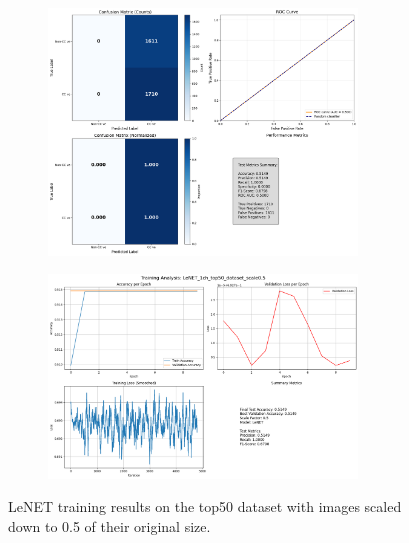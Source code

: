 \documentclass{pracalicmgr}
\begin{document}
\newpage

\begin{figure}[H]
    \centering
    \begin{subfigure}{\textwidth}
        \centering
        \includegraphics[width=0.9\textwidth]{src/LeNET_1ch_top50_dataset_scale05.png}
        \label{fig:Letop5005sub1}
    \end{subfigure}
    
    \vspace{1cm}
    
    \begin{subfigure}{\textwidth}
        \centering
        \includegraphics[width=0.9\textwidth]{src/LeNET_1ch_top50_dataset_scale05loss.png}
        \label{fig:Letop5005sub2}
    \end{subfigure}
    \caption{LeNET training results on the top50 dataset with images scaled down to 0.5 of their original size.}
    \label{fig:Letop5005stacked}
\end{figure}
\end{document}
